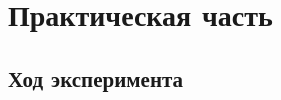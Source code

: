



\def\labauthors{}
\def\labgroup{430}
\def\labnumber{2}
\def\labtheme{Эффект Зеемана}
\renewcommand{\vec}{\mathbf}
\renewcommand{\Re}{\operatorname{Re}}
\renewcommand{\Im}{\operatorname{Im}}
\renewcommand{\phi}{\varphi}
\renewcommand{\hat}{\widehat}



\tableofcontents
\newpage
% 
% 
% 
% 
% 
\section{Практическая часть}
% 
\subsection{Ход эксперимента}


